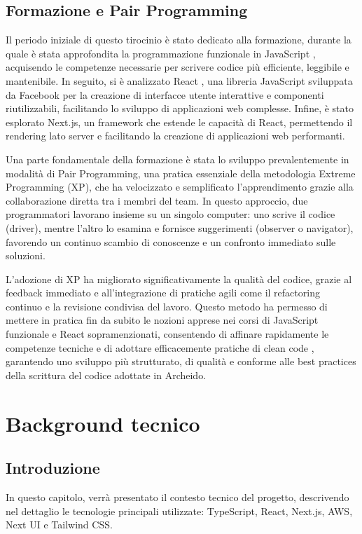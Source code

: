 \documentclass[target=bach,aauheader=,style=]{thud}
\begin{document}
\section{Formazione e Pair Programming}
Il periodo iniziale di questo tirocinio è stato dedicato alla formazione, durante la quale è stata approfondita la programmazione funzionale in JavaScript \cite{knowthen2024}, acquisendo le competenze necessarie per scrivere codice più efficiente, leggibile e mantenibile. In seguito, si è analizzato React \cite{udemyreactredux2024}, una libreria JavaScript sviluppata da Facebook per la creazione di interfacce utente interattive e componenti riutilizzabili, facilitando lo sviluppo di applicazioni web complesse. Infine, è stato esplorato Next.js, un framework che estende le capacità di React, permettendo il rendering lato server e facilitando la creazione di applicazioni web performanti.

\noindent Una parte fondamentale della formazione è stata lo sviluppo prevalentemente in modalità di Pair Programming, una pratica essenziale della metodologia Extreme Programming (XP), che ha velocizzato e semplificato l'apprendimento grazie alla collaborazione diretta tra i membri del team. In questo approccio, due programmatori lavorano insieme su un singolo computer: uno scrive il codice (driver), mentre l'altro lo esamina e fornisce suggerimenti (observer o navigator), favorendo un continuo scambio di conoscenze e un confronto immediato sulle soluzioni.

\noindent L'adozione di XP ha migliorato significativamente la qualità del codice, grazie al feedback immediato e all'integrazione di pratiche agili come il refactoring continuo e la revisione condivisa del lavoro. Questo metodo ha permesso di mettere in pratica fin da subito le nozioni apprese nei corsi di JavaScript funzionale e React sopramenzionati, consentendo di affinare rapidamente le competenze tecniche e di adottare efficacemente pratiche di clean code \cite{martin2008}, garantendo uno sviluppo più strutturato, di qualità e conforme alle best practices della scrittura del codice adottate in Archeido.

\chapter{Background tecnico}

\section{Introduzione}
In questo capitolo, verrà presentato il contesto tecnico del progetto, descrivendo nel dettaglio le tecnologie principali utilizzate: TypeScript, React, Next.js, AWS, Next UI e Tailwind CSS. 
\end{document}
